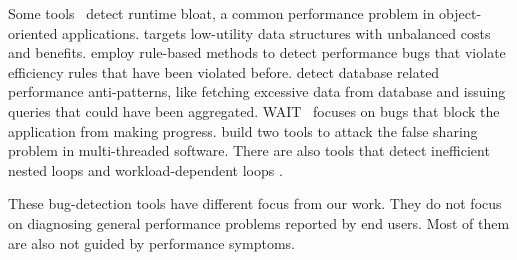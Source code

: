 Some tools~\cite{Dufour:2008:STC:1453101.1453111, Xu:2009:GFP:1542476.1542523, Xu:2010:DIC:1806596.1806616}
detect runtime bloat, a common performance problem in object-oriented 
applications.
\citet{Xu:2010:FLD:1806596.1806617} targets 
low-utility data structures with unbalanced costs and benefits.
\citet{PerfBug} employ rule-based methods to detect performance bugs that
violate efficiency rules that have been violated before.
\citet{ORMPatterns} detect database related performance anti-patterns,
like fetching excessive data from database and issuing queries that could have
been aggregated.
WAIT~\cite{Altman:2010:PAI:1869459.1869519} focuses on bugs that
block the application from making progress.
\citet{Liu:2011:SPD:2048066.2048070} build two tools to attack the false 
sharing problem in multi-threaded software.
There are also tools that detect inefficient nested loops \cite{Alabama}
and workload-dependent
loops \cite{xiao13:context}.

These bug-detection tools have different focus from our work. 
They do not focus on diagnosing general performance problems reported by 
end users. Most of them are also not 
guided by performance symptoms.


